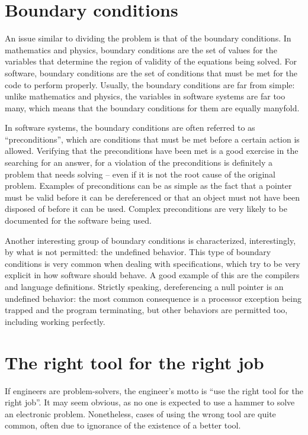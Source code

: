 \section*{Boundary conditions}

An issue similar to dividing the problem is that of the boundary conditions. In
mathematics and physics, boundary conditions are the set of values for the
variables that determine the region of validity of the equations being solved.
For software, boundary conditions are the set of conditions that must be met for
the code to perform properly. Usually, the boundary conditions are far from
simple: unlike mathematics and physics, the variables in software systems are
far too many, which means that the boundary conditions for them are equally
manyfold.

In software systems, the boundary conditions are often referred to as
``preconditions'', which are conditions that must be met before a certain action
is allowed. Verifying that the preconditions have been met is a good exercise in
the searching for an answer, for a violation of the preconditions is definitely
a problem that needs solving -- even if it is not the root cause of the original
problem. Examples of preconditions can be as simple as the fact that a pointer
must be valid before it can be dereferenced or that an object must not have been
disposed of before it can be used. Complex preconditions are very likely to be
documented for the software being used.

Another interesting group of boundary conditions is characterized,
interestingly, by what is not permitted: the undefined behavior. This type of
boundary conditions is very common when dealing with specifications, which try
to be very explicit in how software should behave. A good example of this are
the compilers and language definitions. Strictly speaking, dereferencing a null
pointer is an undefined behavior: the most common consequence is a processor
exception being trapped and the program terminating, but other behaviors are
permitted too, including working perfectly.

\section*{The right tool for the right job}

If engineers are problem-solvers, the engineer’s motto is ``use the right tool
for the right job''. It may seem obvious, as no one is expected to use a hammer
to solve an electronic problem. Nonetheless, cases of using the wrong tool are
quite common, often due to ignorance of the existence of a better tool.

